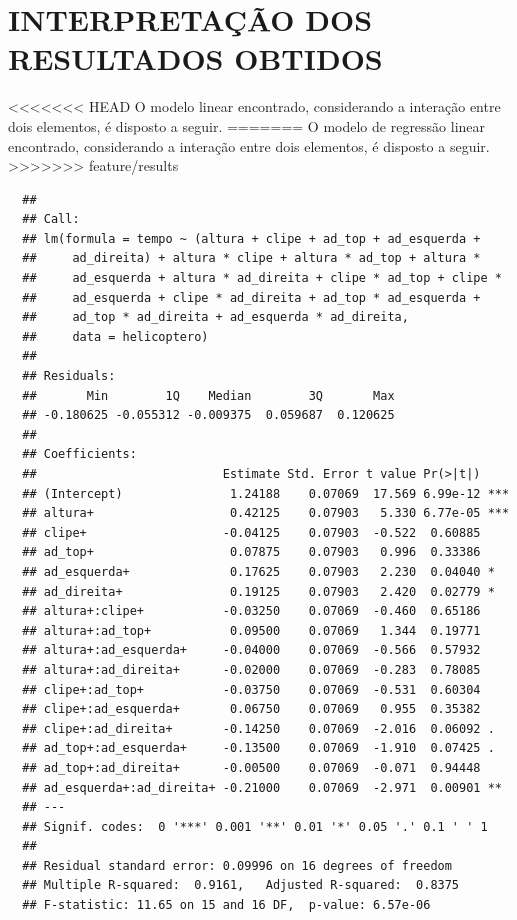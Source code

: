 \chapter{INTERPRETAÇÃO DOS RESULTADOS OBTIDOS}
<<<<<<< HEAD
\label{chap:resultados}
O modelo linear encontrado, considerando a interação entre dois elementos, é disposto a seguir.
=======
O modelo de regressão linear encontrado, considerando a interação entre dois elementos, é disposto a seguir.
>>>>>>> feature/results

\begin{knitrout}
  \color{fgcolor}\begin{kframe}
  \begin{verbatim}
  ## 
  ## Call:
  ## lm(formula = tempo ~ (altura + clipe + ad_top + ad_esquerda + 
  ##     ad_direita) + altura * clipe + altura * ad_top + altura * 
  ##     ad_esquerda + altura * ad_direita + clipe * ad_top + clipe * 
  ##     ad_esquerda + clipe * ad_direita + ad_top * ad_esquerda + 
  ##     ad_top * ad_direita + ad_esquerda * ad_direita,
  ##     data = helicoptero)
  ## 
  ## Residuals:
  ##       Min        1Q    Median        3Q       Max 
  ## -0.180625 -0.055312 -0.009375  0.059687  0.120625 
  ## 
  ## Coefficients:
  ##                          Estimate Std. Error t value Pr(>|t|)    
  ## (Intercept)               1.24188    0.07069  17.569 6.99e-12 ***
  ## altura+                   0.42125    0.07903   5.330 6.77e-05 ***
  ## clipe+                   -0.04125    0.07903  -0.522  0.60885    
  ## ad_top+                   0.07875    0.07903   0.996  0.33386    
  ## ad_esquerda+              0.17625    0.07903   2.230  0.04040 *  
  ## ad_direita+               0.19125    0.07903   2.420  0.02779 *  
  ## altura+:clipe+           -0.03250    0.07069  -0.460  0.65186    
  ## altura+:ad_top+           0.09500    0.07069   1.344  0.19771    
  ## altura+:ad_esquerda+     -0.04000    0.07069  -0.566  0.57932    
  ## altura+:ad_direita+      -0.02000    0.07069  -0.283  0.78085    
  ## clipe+:ad_top+           -0.03750    0.07069  -0.531  0.60304    
  ## clipe+:ad_esquerda+       0.06750    0.07069   0.955  0.35382    
  ## clipe+:ad_direita+       -0.14250    0.07069  -2.016  0.06092 .  
  ## ad_top+:ad_esquerda+     -0.13500    0.07069  -1.910  0.07425 .  
  ## ad_top+:ad_direita+      -0.00500    0.07069  -0.071  0.94448    
  ## ad_esquerda+:ad_direita+ -0.21000    0.07069  -2.971  0.00901 ** 
  ## ---
  ## Signif. codes:  0 '***' 0.001 '**' 0.01 '*' 0.05 '.' 0.1 ' ' 1
  ## 
  ## Residual standard error: 0.09996 on 16 degrees of freedom
  ## Multiple R-squared:  0.9161,	Adjusted R-squared:  0.8375 
  ## F-statistic: 11.65 on 15 and 16 DF,  p-value: 6.57e-06
  \end{verbatim}
  \end{kframe}
  \end{knitrout}

